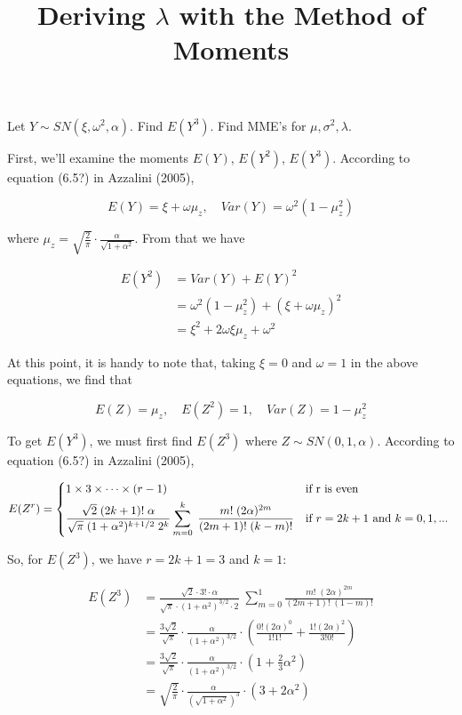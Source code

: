\documentclass{article}
\begin{document}
\title {Deriving $\lambda$ with the Method of Moments}
\date{}
\maketitle

Let $Y \sim SN(\xi, \omega^2, \alpha)$. Find $E(Y^3)$. Find MME's for $\mu, \sigma^2, \lambda$.

First, we'll examine the moments $E(Y)$, $E(Y^2)$, $E(Y^3)$. According to equation (6.5?) in
Azzalini (2005),

\begin{equation}
  E(Y) = \xi + \omega \mu_z, \quad Var(Y) = \omega^2 (1 - \mu_z^2)
\end{equation}

where $\mu_z = \sqrt{\frac{2}{\pi}} \cdot \frac{\alpha}{\sqrt{1 + \alpha^2}}$. From that we have

\begin{align}
  E(Y^2) &= Var(Y) + E(Y)^2 \nonumber \\
  &= \omega^2 (1 - \mu_z^2) + (\xi + \omega \mu_z)^2 \nonumber \\
  &= \xi^2 + 2 \omega \xi \mu_z + \omega^2
\end{align}

At this point, it is handy to note that, taking $\xi = 0$ and $\omega = 1$ in the above equations,
we find that

\begin{equation}
  E(Z) = \mu_z, \quad E(Z^2) = 1, \quad Var(Z) = 1 - \mu_z^2
\end{equation}

To get $E(Y^3)$, we must first find $E(Z^3)$ where $Z \sim SN(0, 1, \alpha)$. According to equation
(6.5?) in Azzalini (2005),

\[
E(Z^r) =
 \begin{dcases*}
   1 \times 3 \times \cdots \times (r -1) & if r is even \\
   \frac{\sqrt{2}\;(2k + 1)!\;\alpha}{\sqrt{\pi}\;(1 + \alpha^2)^{k + 1/2}\;2^k}
   \sum_{m=0}^k\;\frac{m!\;(2\alpha)^{2m}}{(2m+1)!\;(k-m)!} & if $r = 2k+1$ and $k = 0, 1, ...$
\end{dcases*}
\]

So, for $E(Z^3)$, we have $r = 2k + 1 = 3$ and $k = 1$:

\begin{align}
  E(Z^3) &= \frac{\sqrt{2} \cdot 3! \cdot \alpha}{\sqrt{\pi} \cdot (1 + \alpha^2)^{3/2} \cdot 2} \;
  \sum_{m=0}^1 \frac{m!\;(2\alpha)^{2m}}{(2m + 1)!\;(1 - m)!} \nonumber \\
  &= \frac{3\sqrt{2}}{\sqrt{\pi}} \cdot \frac{\alpha}{(1 + \alpha^2)^{3/2}} \cdot \left( \frac{0!
      (2\alpha)^0}{1!1!} + \frac{1! (2\alpha)^2}{3!0!} \right) \nonumber \\
  &= \frac{3\sqrt{2}}{\sqrt{\pi}} \cdot \frac{\alpha}{(1 + \alpha^2)^{3/2}} \cdot \left( 1 +
    \frac{2}{3}\alpha^2 \right) \nonumber \\
  &= \sqrt{\frac{2}{\pi}} \cdot \frac{\alpha}{(\sqrt{1 + \alpha^2})^3} \cdot (3 + 2 \alpha^2)
\end{align}
\end{document}
